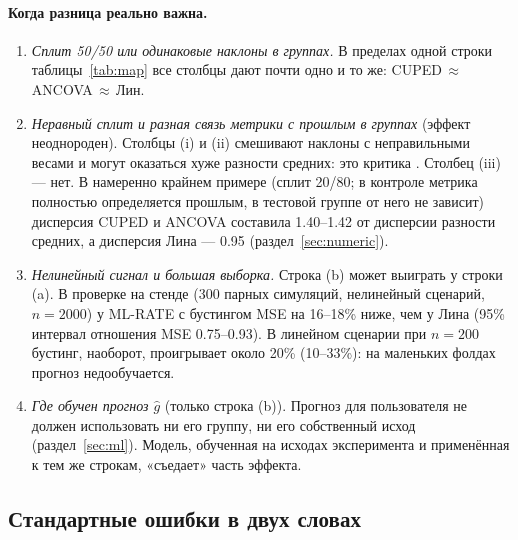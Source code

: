 \documentclass[10pt,a4paper]{article}
\begin{document}
\paragraph{Когда разница реально важна.}
\begin{enumerate}
  \item \emph{Сплит 50/50 или одинаковые наклоны в группах.} В пределах одной строки таблицы~\ref{tab:map}
        все столбцы дают почти одно и то же: CUPED\,$\approx$\,ANCOVA\,$\approx$\,Лин.
  \item \emph{Неравный сплит и разная связь метрики с прошлым в группах} (эффект неоднороден).
        Столбцы (i) и (ii) смешивают наклоны с неправильными весами и могут оказаться хуже разности
        средних: это критика \citet{freedman2008}. Столбец (iii) --- нет. В намеренно крайнем примере
        (сплит 20/80; в контроле метрика полностью определяется прошлым, в тестовой группе от него не
        зависит) дисперсия CUPED и ANCOVA составила 1.40--1.42 от дисперсии разности средних, а дисперсия
        Лина --- 0.95 (раздел~\ref{sec:numeric}).
  \item \emph{Нелинейный сигнал и большая выборка.} Строка (b) может выиграть у строки (a).
        В проверке на стенде (300 парных симуляций, нелинейный сценарий, $n=2000$) у ML-RATE с бустингом
        MSE на 16--18\% ниже, чем у Лина (95\% интервал отношения MSE 0.75--0.93). В линейном сценарии
        при $n=200$ бустинг, наоборот, проигрывает около 20\% (10--33\%): на маленьких фолдах прогноз
        недообучается.
  \item \emph{Где обучен прогноз $\hat g$} (только строка (b)). Прогноз для пользователя не должен
        использовать ни его группу, ни его собственный исход (раздел~\ref{sec:ml}). Модель, обученная на
        исходах эксперимента и применённая к тем же строкам, «съедает» часть эффекта.
\end{enumerate}

\subsection{Стандартные ошибки в двух словах}
\end{document}
